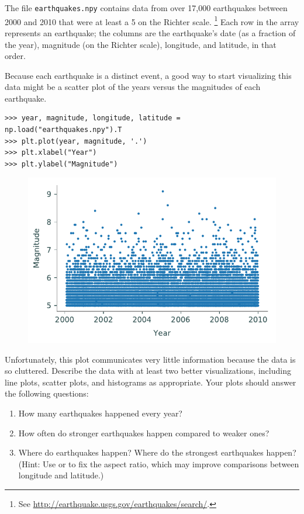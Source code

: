 \begin{problem} %
The file \texttt{earthquakes.npy} contains data from over 17,000 earthquakes between 2000 and 2010 that were at least a 5 on the Richter scale.%
\footnote{See \url{http://earthquake.usgs.gov/earthquakes/search/}.}
Each row in the array represents an earthquake;
the columns are the earthquake's date (as a fraction of the year), magnitude (on the Richter scale), longitude, and latitude, in that order.

Because each earthquake is a distinct event, a good way to start visualizing this data might be a scatter plot of the years versus the magnitudes of each earthquake.

\begin{lstlisting}
>>> year, magnitude, longitude, latitude = np.load("earthquakes.npy").T
>>> plt.plot(year, magnitude, '.')
>>> plt.xlabel("Year")
>>> plt.ylabel("Magnitude")
\end{lstlisting}

\begin{figure}[H] %
    \centering
    \includegraphics[width=.7\textwidth]{figures/earthquake.pdf}
\end{figure}

Unfortunately, this plot communicates very little information because the data is so cluttered.
Describe the data with at least two better visualizations, including line plots, scatter plots, and histograms as appropriate.
Your plots should answer the following questions:
\begin{enumerate}
    \item How many earthquakes happened every year?
    \item How often do stronger earthquakes happen compared to weaker ones?
    \item Where do earthquakes happen? Where do the strongest earthquakes happen?
    \\(Hint: Use  or  to fix the aspect ratio, which may improve comparisons between longitude and latitude.)
\end{enumerate}
\end{problem}

